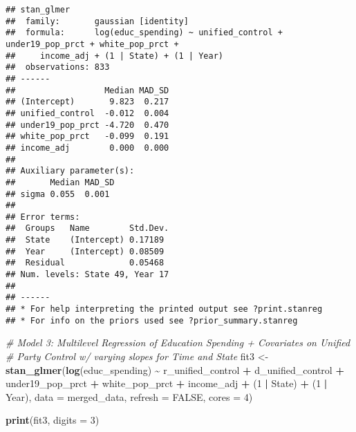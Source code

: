 \documentclass[
]{article}
\newenvironment{Shaded}{\begin{snugshade}}{\end{snugshade}}
\newcommand{\AttributeTok}[1]{\textcolor[rgb]{0.13,0.29,0.53}{#1}}
\newcommand{\CommentTok}[1]{\textcolor[rgb]{0.56,0.35,0.01}{\textit{#1}}}
\newcommand{\ConstantTok}[1]{\textcolor[rgb]{0.56,0.35,0.01}{#1}}
\newcommand{\DecValTok}[1]{\textcolor[rgb]{0.00,0.00,0.81}{#1}}
\newcommand{\FunctionTok}[1]{\textcolor[rgb]{0.13,0.29,0.53}{\textbf{#1}}}
\newcommand{\NormalTok}[1]{#1}
\newcommand{\OtherTok}[1]{\textcolor[rgb]{0.56,0.35,0.01}{#1}}
\newcommand{\SpecialCharTok}[1]{\textcolor[rgb]{0.81,0.36,0.00}{\textbf{#1}}}
\begin{document}
\begin{verbatim}
## stan_glmer
##  family:       gaussian [identity]
##  formula:      log(educ_spending) ~ unified_control + under19_pop_prct + white_pop_prct + 
##     income_adj + (1 | State) + (1 | Year)
##  observations: 833
## ------
##                  Median MAD_SD
## (Intercept)       9.823  0.217
## unified_control  -0.012  0.004
## under19_pop_prct -4.720  0.470
## white_pop_prct   -0.099  0.191
## income_adj        0.000  0.000
## 
## Auxiliary parameter(s):
##       Median MAD_SD
## sigma 0.055  0.001 
## 
## Error terms:
##  Groups   Name        Std.Dev.
##  State    (Intercept) 0.17189 
##  Year     (Intercept) 0.08509 
##  Residual             0.05468 
## Num. levels: State 49, Year 17 
## 
## ------
## * For help interpreting the printed output see ?print.stanreg
## * For info on the priors used see ?prior_summary.stanreg
\end{verbatim}

\begin{Shaded}
\begin{Highlighting}[]
\CommentTok{\# Model 3: Multilevel Regression of Education Spending + Covariates on Unified }
\CommentTok{\# Party Control w/ varying slopes for Time and State}
\NormalTok{fit3 }\OtherTok{\textless{}{-}} \FunctionTok{stan\_glmer}\NormalTok{(}\FunctionTok{log}\NormalTok{(educ\_spending) }\SpecialCharTok{\textasciitilde{}}\NormalTok{ r\_unified\_control }\SpecialCharTok{+} 
\NormalTok{                     d\_unified\_control }\SpecialCharTok{+} 
\NormalTok{                     under19\_pop\_prct }\SpecialCharTok{+} 
\NormalTok{                     white\_pop\_prct }\SpecialCharTok{+} 
\NormalTok{                     income\_adj }\SpecialCharTok{+} 
\NormalTok{                     (}\DecValTok{1} \SpecialCharTok{|}\NormalTok{ State) }\SpecialCharTok{+} 
\NormalTok{                     (}\DecValTok{1} \SpecialCharTok{|}\NormalTok{ Year),}
                   \AttributeTok{data =}\NormalTok{ merged\_data,}
                   \AttributeTok{refresh =} \ConstantTok{FALSE}\NormalTok{,}
                   \AttributeTok{cores =} \DecValTok{4}\NormalTok{)}

\FunctionTok{print}\NormalTok{(fit3, }\AttributeTok{digits =} \DecValTok{3}\NormalTok{)}
\end{Highlighting}
\end{Shaded}
\end{document}
